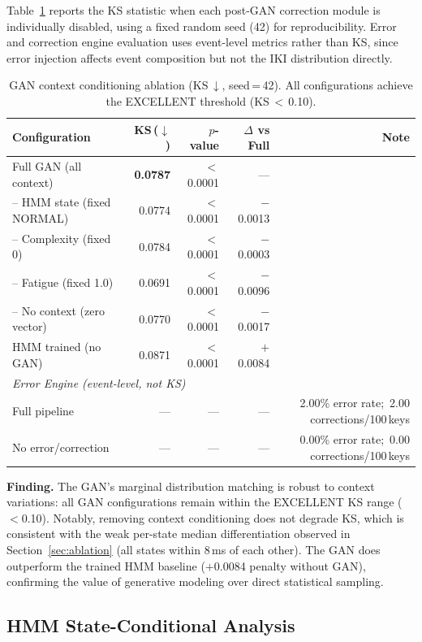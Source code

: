 \documentclass[sigconf,nonacm]{acmart}
\begin{document}
Table~\ref{tab:ablation} reports the KS statistic when each post-GAN correction module
is individually disabled, using a fixed random seed (42) for reproducibility.
Error and correction engine evaluation uses event-level metrics rather than KS,
since error injection affects event composition but not the IKI distribution directly.

\begin{table}[t]
\centering
\caption{GAN context conditioning ablation (KS\,$\downarrow$, seed\,=\,42).
  All configurations achieve the EXCELLENT threshold (KS\,$<$\,0.10).}
\begin{tabular}{lrrrr}
\toprule
Configuration & KS\,($\downarrow$) & $p$-value & $\Delta$ vs Full & Note \\
\midrule
Full GAN (all context)            & \textbf{0.0787} & $<$0.0001 & — & \\
\quad -- HMM state (fixed NORMAL) & 0.0774 & $<$0.0001 & $-$0.0013 & \\
\quad -- Complexity (fixed 0)     & 0.0784 & $<$0.0001 & $-$0.0003 & \\
\quad -- Fatigue (fixed 1.0)      & 0.0691 & $<$0.0001 & $-$0.0096 & \\
\quad -- No context (zero vector) & 0.0770 & $<$0.0001 & $-$0.0017 & \\
HMM trained (no GAN)              & 0.0871 & $<$0.0001 & $+$0.0084 & \\
\midrule
\multicolumn{5}{l}{\textit{Error Engine (event-level, not KS)}} \\
Full pipeline       & — & — & — & 2.00\% error rate;\ 2.00 corrections/100\,keys \\
No error/correction & — & — & — & 0.00\% error rate;\ 0.00 corrections/100\,keys \\
\bottomrule
\end{tabular}
\label{tab:ablation}
\end{table}

\textbf{Finding.} The GAN's marginal distribution matching is robust to context
variations: all GAN configurations remain within the EXCELLENT KS range ($<$0.10).
Notably, removing context conditioning does not degrade KS, which is consistent with the
weak per-state median differentiation observed in Section~\ref{sec:ablation}
(all states within 8\,ms of each other).
The GAN does outperform the trained HMM baseline ($+$0.0084 penalty without GAN),
confirming the value of generative modeling over direct statistical sampling.

\subsection{HMM State-Conditional Analysis}
\end{document}
